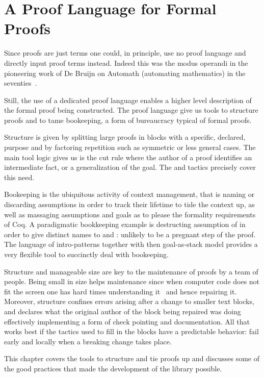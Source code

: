 \chapter{A Proof Language for Formal Proofs}{}
\label{ch:script}


Since proofs are just terms one could, in principle, use no proof
language and directly input proof terms instead.  Indeed this was the
modus operandi in the pioneering work of De Bruijn on Automath
(automating mathematics) in the seventies~\cite{nederpelt-94}.

Still, the use of a dedicated proof language enables a higher level
description of the formal proof being constructed.  
The \mcbSSR{} proof language give us tools to structure proofs and
to tame bookeeping, a form of bureaucracy typical of formal proofs.

Structure is given by splitting large proofs in blocks with a
specific, declared, purpose and by factoring repetition such as
symmetric or less general cases. The main tool logic gives us is the
cut rule where the author of a proof identifies an intermediate fact,
or a generalization of the goal. The  and  tactics
precisely cover this need.

Bookeeping is the ubiquitous activity of context management, that is
naming or discarding assumptions in order to track their lifetime to tide
the context up, as well as massaging assumptions and goals as to
please the formality requirements of Coq.  A paradigmatic bookkeeping
example is destructing assumption of  in order to give
distinct names to  and : unlikely to be a pregnant step of
the proof.  The language of intro-patterns together with then
goal-as-stack model provides a very flexible tool to
succinctly deal with bookeeping.

Structure and manageable size are key to the maintenance of proofs by
a team of people.  Being small in size helps maintenance since when
computer code does not fit the screen one has hard times understanding
it~\cite{Weinberg:1985:PCP:536771} and hence repairing it.  Moreover,
structure confines errors arising after a change to smaller text
blocks, and declares what the original author of the block being
repaired was doing effectively implementing a form of check pointing
and documentation.  All that works best if the tactics used to fill in
the blocks have a predictable behavior: fail early and locally when a
breaking change takes place.

This chapter covers the tools to structure and tie proofs up and discusses
some of the good practices that made the development of the \mcbMC{}
library possible.

